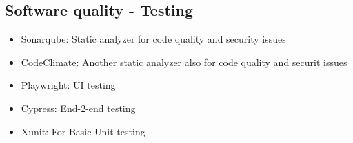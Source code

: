 \subsection*{Software quality - Testing}

\begin{itemize}
	\item Sonarqube: Static analyzer for code quality and security issues
	\item CodeClimate: Another static analyzer also for code quality and securit issues
	\item Playwright: UI testing
	\item Cypress: End-2-end testing
	\item Xunit: For Basic Unit testing
\end{itemize}

